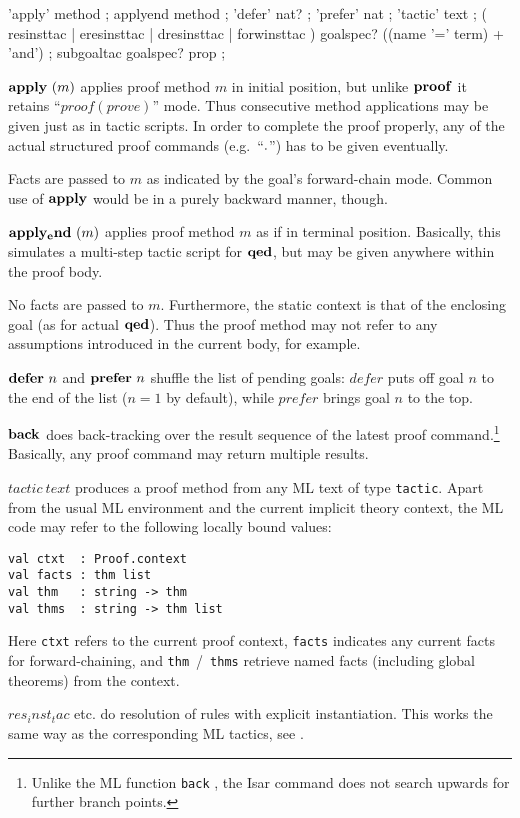 \begin{rail}
  'apply' method
  ;
  applyend method
  ;
  'defer' nat?
  ;
  'prefer' nat
  ;
  'tactic' text
  ;
  ( resinsttac | eresinsttac | dresinsttac | forwinsttac ) goalspec? ((name '=' term) + 'and')
  ;
  subgoaltac goalspec? prop
  ;
\end{rail}

\begin{descr}
\item [${\mathord{\mathbf{apply}}}~(m)$] applies proof method $m$ in initial
  position, but unlike ${\mathord{\mathbf{proof}}}$ it retains ``$proof(prove)$'' mode.  Thus
  consecutive method applications may be given just as in tactic scripts.  In
  order to complete the proof properly, any of the actual structured proof
  commands (e.g.\ ``${\mathord{\mathbf{.}}}$'') has to be given eventually.
  
  Facts are passed to $m$ as indicated by the goal's forward-chain mode.
  Common use of ${\mathord{\mathbf{apply}}}$ would be in a purely backward manner,
  though.
\item [${\mathord{\mathbf{apply_end}}}~(m)$] applies proof method $m$ as if in
  terminal position.  Basically, this simulates a multi-step tactic script for
  ${\mathord{\mathbf{qed}}}$, but may be given anywhere within the proof body.
  
  No facts are passed to $m$.  Furthermore, the static context is that of the
  enclosing goal (as for actual ${\mathord{\mathbf{qed}}}$).  Thus the proof method may not
  refer to any assumptions introduced in the current body, for example.
\item [${\mathord{\mathbf{defer}}}~n$ and ${\mathord{\mathbf{prefer}}}~n$] shuffle the list
  of pending goals: $defer$ puts off goal $n$ to the end of the list ($n = 1$
  by default), while $prefer$ brings goal $n$ to the top.
\item [${\mathord{\mathbf{back}}}$] does back-tracking over the result sequence of
  the latest proof command.\footnote{Unlike the ML function \texttt{back}
    \cite{isabelle-ref}, the Isar command does not search upwards for further
    branch points.} Basically, any proof command may return multiple results.
\item [$tactic~text$] produces a proof method from any ML text of type
  \texttt{tactic}.  Apart from the usual ML environment and the current
  implicit theory context, the ML code may refer to the following locally
  bound values:
{\footnotesize\begin{verbatim}
val ctxt  : Proof.context
val facts : thm list
val thm   : string -> thm
val thms  : string -> thm list
\end{verbatim}}
  Here \texttt{ctxt} refers to the current proof context, \texttt{facts}
  indicates any current facts for forward-chaining, and
  \texttt{thm}~/~\texttt{thms} retrieve named facts (including global
  theorems) from the context.
\item [$res_inst_tac$ etc.] do resolution of rules with explicit
  instantiation.  This works the same way as the corresponding ML tactics, see
  \cite[\S3]{isabelle-ref}.
  

\end{descr}
